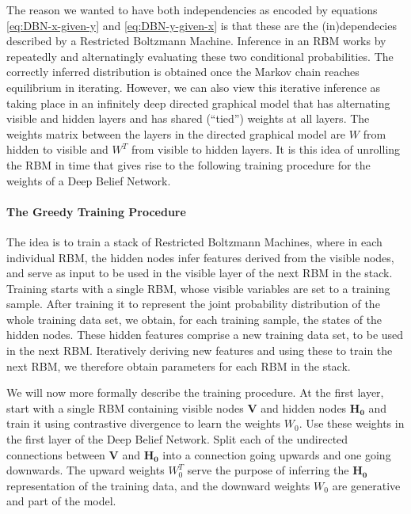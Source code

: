 The reason we wanted to have both independencies as encoded by equations
\ref{eq:DBN-x-given-y} and \ref{eq:DBN-y-given-x} is that these
are the (in)dependecies described by a Restricted Boltzmann Machine.
Inference in an RBM works by repeatedly and alternatingly evaluating
these two conditional probabilities. The correctly inferred distribution
is obtained once the Markov chain reaches equilibrium in iterating.
However, we can also view this iterative inference as taking place
in an infinitely deep directed graphical model that has alternating
visible and hidden layers and has shared (``tied'') weights
at all layers. The weights matrix between the layers in the directed
graphical model are $W$ from hidden to visible and $W^{T}$ from
visible to hidden layers.  It is this idea of unrolling the RBM in
time that gives rise to the following training procedure for the weights
of a Deep Belief Network.

\paragraph{The Greedy Training Procedure}

The idea is to train a stack of Restricted Boltzmann Machines, where
in each individual RBM, the hidden nodes infer features derived from
the visible nodes, and serve as input to be used in the visible layer
of the next RBM in the stack. Training starts with a single RBM, whose
visible variables are set to a training sample. After training it
to represent the joint probability distribution of the whole training
data set, we obtain, for each training sample, the states of the hidden
nodes. These hidden features comprise a new training data set, to
be used in the next RBM. Iteratively deriving new features and using
these to train the next RBM, we therefore obtain parameters for each
RBM in the stack.

We will now more formally describe the training procedure. At the
first layer, start with a single RBM containing visible nodes $\mathbf{V}$
and hidden nodes $\mathbf{H_{0}}$ and train it using contrastive
divergence to learn the weights $W_{0}$. Use these weights in the
first layer of the Deep Belief Network. Split each of the undirected
connections between $\mathbf{V}$ and $\mathbf{H_{0}}$ into a connection
going upwards and one going downwards. The upward weights $W_{0}^{T}$
serve the purpose of inferring the $\mathbf{H_{0}}$ representation
of the training data, and the downward weights $W_{0}$ are generative
and part of the model.

